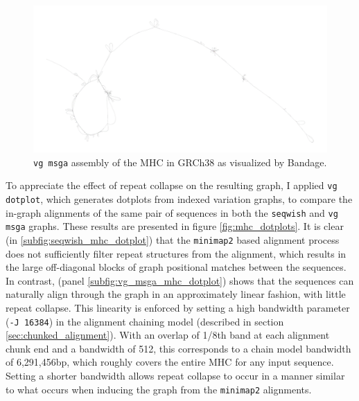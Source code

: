 \begin{figure}[htbp!]
  \includegraphics[width=1.0\textwidth]{Chapter3/Figs/MHC_vg-msga_v1_9_0-115-gc20e80f_gfa.png}
  \caption[{\tt vg msga} assembly of the MHC in GRCh38.]{
    {\tt vg msga} assembly of the MHC in GRCh38 as visualized by Bandage.
  }
  \label{fig:vg_msga_mhc}
\end{figure}

To appreciate the effect of repeat collapse on the resulting graph, I applied {\tt vg dotplot}, which generates dotplots from indexed variation graphs, to compare the in-graph alignments of the same pair of sequences in both the {\tt seqwish} and {\tt vg msga} graphs.
These results are presented in figure \ref{fig:mhc_dotplots}.
It is clear (in \ref{subfig:seqwish_mhc_dotplot}) that the {\tt minimap2} based alignment process does not sufficiently filter repeat structures from the alignment, which results in the large off-diagonal blocks of graph positional matches between the sequences.
In contrast, (panel \ref{subfig:vg_msga_mhc_dotplot}) shows that the sequences can naturally align through the graph in an approximately linear fashion, with little repeat collapse.
This linearity is enforced by setting a high bandwidth parameter ({\tt -J 16384}) in the alignment chaining model (described in section \ref{sec:chunked_alignment}).
With an overlap of 1/8th band at each alignment chunk end and a bandwidth of 512, this corresponds to a chain model bandwidth of 6,291,456bp, which roughly covers the entire MHC for any input sequence.
Setting a shorter bandwidth allows repeat collapse to occur in a manner similar to what occurs when inducing the graph from the {\tt minimap2} alignments.

